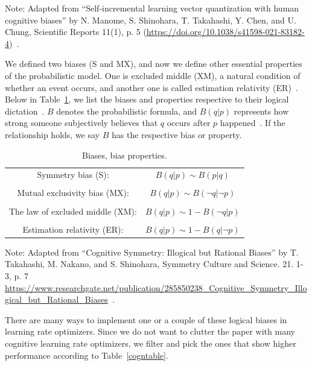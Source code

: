 \noindent Note: Adapted from “Self‑incremental learning vector
quantization with human cognitive
biases” by N. Manome, S. Shinohara, T. Takahashi, Y. Chen, and U. Chung, Scientific Reports 11(1), p. 5 (\url{https://doi.org/10.1038/s41598-021-83182-4})~\cite{lrimp}.
\vspace{10pt}

We defined two biases (S and MX), and now we define other essential properties of the probabilistic model. One is excluded middle (XM), a natural condition of whether an event occurs, and another one is called estimation relativity (ER)~\cite{cogn}. Below in Table~\ref{biastable}, we list the biases and properties respective to their logical dictation~\cite{cogn}. $B$ denotes the probabilistic formula, and $B(q|p)$ represents how strong someone subjectively believes that $q$ occurs after $p$ happened~\cite{cogn}. If the relationship holds, we say $B$ has the respective bias or property.

\begin{table}[H]
\centering
\begin{tabular}{c c}
Symmetry bias (S): &$B(q|p) \sim B(p|q)$\\[0.5ex]
\\
Mutual exclusivity bias (MX): &$B(q|p) \sim B(\neg q|\neg p)$\\[0.5ex]
\\
The law of excluded middle (XM): &$B(q|p) \sim 1- B(\neg q | p)$\\[0.5ex]
\\
Estimation relativity (ER): &$B(q|p) \sim 1- B(q|\neg p)$\\[0.5ex]
\end{tabular}
\caption{Biases, bias properties.}\label{biastable}
\end{table}

\noindent Note: Adapted from “Cognitive Symmetry: Illogical but Rational Biases” by T. Takahashi, M. Nakano, and S. Shinohara, Symmetry Culture and Science. 21. 1-3, p. 7 \url{https://www.researchgate.net/publication/285850238_Cognitive_Symmetry_Illogical_but_Rational_Biases}~\cite{cogn}.
\vspace{10pt}

There are many ways to implement one or a couple of these logical biases in learning rate optimizers. Since we do not want to clutter the paper with many cognitive learning rate optimizers, we filter and pick the ones that show higher performance according to Table~\ref{cogntable}.

